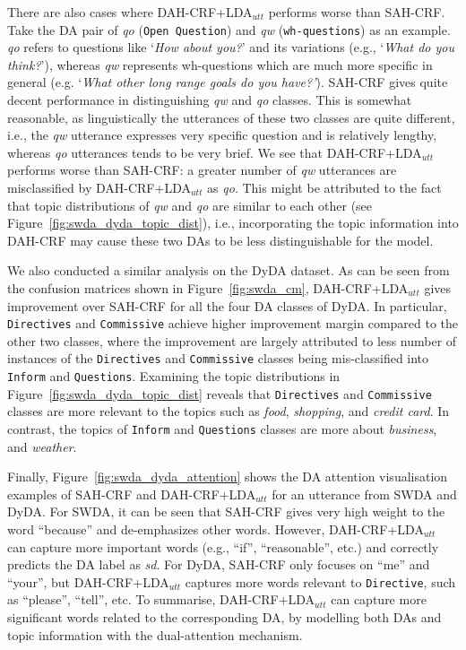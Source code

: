 \documentclass[11pt,a4paper]{article}
\begin{document}
There are also cases where DAH-CRF+LDA$_{utt}$ performs worse than SAH-CRF. Take the DA pair of \textit{qo} (\texttt{Open Question}) and \textit{qw} (\texttt{wh-questions}) as an example. \textit{qo} refers to questions like `\textit{How about you?}' and its variations (e.g., `\textit{What do you think?}'), whereas \textit{qw} represents  wh-questions which are much more specific in general  (e.g. `\textit{What other long range goals do you have?'}). 
SAH-CRF gives quite decent performance in distinguishing \textit{qw} and \textit{qo} classes. This is somewhat reasonable,  as linguistically the utterances of these two classes are quite different, i.e., the \textit{qw} utterance expresses very specific question and is relatively lengthy, whereas \textit{qo} utterances tends to be very brief. We see that DAH-CRF+LDA$_{utt}$  performs worse than SAH-CRF: a greater number of \textit{qw} utterances are misclassified by DAH-CRF+LDA$_{utt}$ as \textit{qo}. This might be attributed to the fact that topic distributions of \textit{qw} and \textit{qo} are similar to each other (see  Figure~\ref{fig:swda_dyda_topic_dist}), i.e., incorporating the topic information into DAH-CRF may cause these two DAs to be less distinguishable for the model. 



We also conducted a similar analysis on the DyDA dataset. As can be seen from the confusion matrices shown in Figure~\ref{fig:swda_cm}, DAH-CRF+LDA$_{utt}$ gives improvement over SAH-CRF for all the four DA classes of DyDA. In particular, \texttt{Directives} and \texttt{Commissive} achieve higher improvement margin compared to the other two classes, where the improvement are largely attributed to less number of instances of the \texttt{Directives} and \texttt{Commissive} classes being mis-classified into \texttt{Inform} and \texttt{Questions}. 
Examining the topic distributions in Figure~\ref{fig:swda_dyda_topic_dist}
reveals that  \texttt{Directives} and \texttt{Commissive} classes are more relevant to the topics such as \textit{food}, \textit{shopping}, and \textit{credit card}. In contrast, the topics of \texttt{Inform} and \texttt{Questions} classes are more about \textit{business}, and \textit{weather}.  





Finally, Figure~\ref{fig:swda_dyda_attention} shows the DA attention visualisation examples of SAH-CRF and DAH-CRF+LDA$_{utt}$ for an utterance from SWDA and DyDA. For SWDA, it can be seen that SAH-CRF gives very high weight to  the word ``because'' and de-emphasizes other words. However, DAH-CRF+LDA$_{utt}$ can capture more important words (e.g.,  ``if'', ``reasonable'', etc.) and correctly predicts the DA label as \textit{sd}. For DyDA, SAH-CRF only focuses on ``me'' and ``your'', but DAH-CRF+LDA$_{utt}$ captures more words relevant to \texttt{Directive}, such as ``please'', ``tell'', etc. To summarise, DAH-CRF+LDA$_{utt}$ can capture  more significant words related to the corresponding DA, by modelling both DAs and topic information with the dual-attention mechanism.
\end{document}
